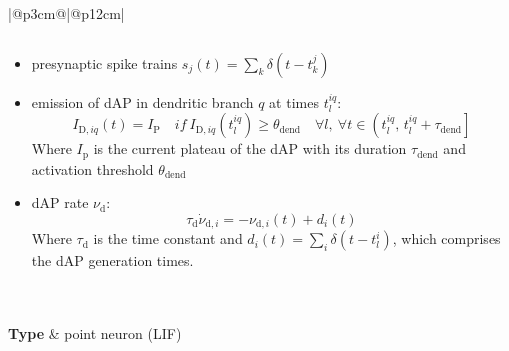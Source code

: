 \documentclass[10pt,a4paper,twoside,american]{article}
\newcommand{\ND}{{N_{\textnormal{D}}}}
\begin{document}
\begin{table}[ht!]
\begin{tabular}{|@{\hspace*{1mm}}p{3cm}@{}|@{\hspace*{1mm}}p{12cm}|}
\begin{itemize}
\begin{equation*}
               \end{equation*}
               \item presynaptic spike trains $s_j(t)=\sum_k \delta(t-t_k^j)$
               \item emission of dAP in dendritic branch $q$ at times $t_{l}^{iq}$:    
               \begin{equation*}
                  I_{\text{D},iq}(t) = I_\text{P}\quad  
                  if \     I_{\text{D},iq}(t_{l}^{iq})\geq\theta_{\text{dend}}\quad 
                  \forall{}l,\ \forall t \in \left(t_{l}^{iq},\,t_{l}^{iq}+\tau_\text{dend}\right]    
               \end{equation*}
               Where $I_\text{p}$ is the current plateau of the dAP with its duration $\tau_\text{dend}$ and activation threshold $\theta_{\text{dend}}$
                
               \item dAP rate $\nu_{\text{d}}$:   
               \begin{equation*}
                 \tau_\text{d}\dot{\nu}_{\text{d}, i} = -\nu_{\text{d}, i}(t) + d_i(t)
               \end{equation*}
               Where $\tau_\text{d}$ is the time constant and $d_i(t)=\sum_i \delta(t-t_l^i)$, which comprises the dAP generation times.        
   
              \end{itemize}\\
  \hline
      \\
  \hline
  \textbf{Type} & point neuron (LIF) \\


\end{tabular}
\end{table}
\end{document}
